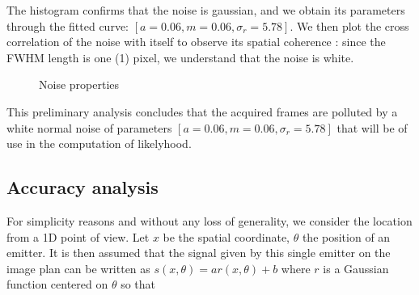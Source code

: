 \documentclass[10pt,letterpaper]{article}
\begin{document}
The histogram confirms that the noise is gaussian, and we obtain its parameters through the fitted curve: $ [a = 0.06, m = 0.06, \sigma_r = 5.78] $. We then plot the cross correlation of the noise with itself to observe its spatial coherence : since the FWHM length is one (1) pixel, we understand that the noise is white.

\begin{figure}[h]
     \centering
     \caption{Noise properties}
\end{figure}

This preliminary analysis concludes that the acquired frames are polluted by a white normal noise of parameters $ [a = 0.06, m = 0.06, \sigma_r = 5.78] $ that will be of use in the computation of likelyhood.

\subsection{Accuracy analysis}\label{accuracy-analysis}

For simplicity reasons and without any loss of generality, we consider the location from a 1D point of view. Let $x$ be the spatial coordinate, $\theta$ the position of an emitter. It is then assumed that the signal given by this single emitter on the image plan can be written as $s(x, \theta)=a r(x, \theta)+b$ where $r$ is a Gaussian function centered on $\theta$ so that
\end{document}
